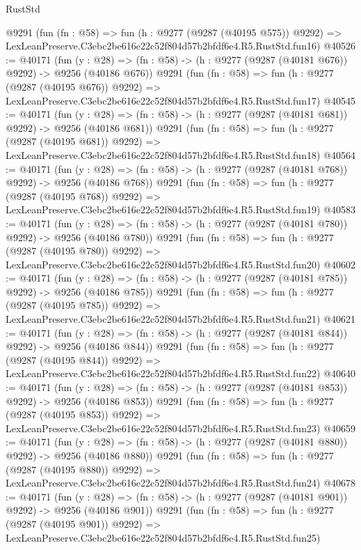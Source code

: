 \begin{lexlean}{RustStd}
\begin{coremodule}
    @9291
    (fun (fn : @58) =>
    fun (h : @9277 (@9287 (@40195 @575)) @9292) =>
    LexLeanPreserve.C3ebc2be616e22c52f804d57b2bfdf6e4.R5.RustStd.fun16)
@40526 := @40171
    (fun (y : @28) => (fn : @58) -> (h : @9277 (@9287 (@40181 @676)) @9292) -> @9256 (@40186 @676))
    @9291
    (fun (fn : @58) =>
    fun (h : @9277 (@9287 (@40195 @676)) @9292) =>
    LexLeanPreserve.C3ebc2be616e22c52f804d57b2bfdf6e4.R5.RustStd.fun17)
@40545 := @40171
    (fun (y : @28) => (fn : @58) -> (h : @9277 (@9287 (@40181 @681)) @9292) -> @9256 (@40186 @681))
    @9291
    (fun (fn : @58) =>
    fun (h : @9277 (@9287 (@40195 @681)) @9292) =>
    LexLeanPreserve.C3ebc2be616e22c52f804d57b2bfdf6e4.R5.RustStd.fun18)
@40564 := @40171
    (fun (y : @28) => (fn : @58) -> (h : @9277 (@9287 (@40181 @768)) @9292) -> @9256 (@40186 @768))
    @9291
    (fun (fn : @58) =>
    fun (h : @9277 (@9287 (@40195 @768)) @9292) =>
    LexLeanPreserve.C3ebc2be616e22c52f804d57b2bfdf6e4.R5.RustStd.fun19)
@40583 := @40171
    (fun (y : @28) => (fn : @58) -> (h : @9277 (@9287 (@40181 @780)) @9292) -> @9256 (@40186 @780))
    @9291
    (fun (fn : @58) =>
    fun (h : @9277 (@9287 (@40195 @780)) @9292) =>
    LexLeanPreserve.C3ebc2be616e22c52f804d57b2bfdf6e4.R5.RustStd.fun20)
@40602 := @40171
    (fun (y : @28) => (fn : @58) -> (h : @9277 (@9287 (@40181 @785)) @9292) -> @9256 (@40186 @785))
    @9291
    (fun (fn : @58) =>
    fun (h : @9277 (@9287 (@40195 @785)) @9292) =>
    LexLeanPreserve.C3ebc2be616e22c52f804d57b2bfdf6e4.R5.RustStd.fun21)
@40621 := @40171
    (fun (y : @28) => (fn : @58) -> (h : @9277 (@9287 (@40181 @844)) @9292) -> @9256 (@40186 @844))
    @9291
    (fun (fn : @58) =>
    fun (h : @9277 (@9287 (@40195 @844)) @9292) =>
    LexLeanPreserve.C3ebc2be616e22c52f804d57b2bfdf6e4.R5.RustStd.fun22)
@40640 := @40171
    (fun (y : @28) => (fn : @58) -> (h : @9277 (@9287 (@40181 @853)) @9292) -> @9256 (@40186 @853))
    @9291
    (fun (fn : @58) =>
    fun (h : @9277 (@9287 (@40195 @853)) @9292) =>
    LexLeanPreserve.C3ebc2be616e22c52f804d57b2bfdf6e4.R5.RustStd.fun23)
@40659 := @40171
    (fun (y : @28) => (fn : @58) -> (h : @9277 (@9287 (@40181 @880)) @9292) -> @9256 (@40186 @880))
    @9291
    (fun (fn : @58) =>
    fun (h : @9277 (@9287 (@40195 @880)) @9292) =>
    LexLeanPreserve.C3ebc2be616e22c52f804d57b2bfdf6e4.R5.RustStd.fun24)
@40678 := @40171
    (fun (y : @28) => (fn : @58) -> (h : @9277 (@9287 (@40181 @901)) @9292) -> @9256 (@40186 @901))
    @9291
    (fun (fn : @58) =>
    fun (h : @9277 (@9287 (@40195 @901)) @9292) =>
    LexLeanPreserve.C3ebc2be616e22c52f804d57b2bfdf6e4.R5.RustStd.fun25)

\end{coremodule}
\end{lexlean}
